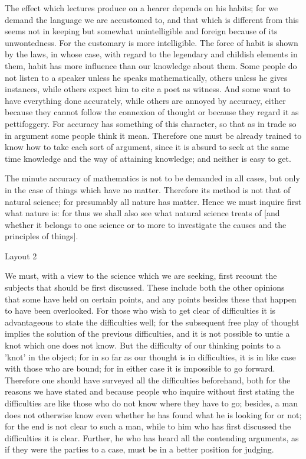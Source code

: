 The effect which lectures produce on a hearer depends on his habits; for we demand the language we are accustomed to, and that which is different from this seems not in keeping but somewhat unintelligible and foreign because of its unwontedness. For the customary is more intelligible. The force of habit is shown by the laws, in whose case, with regard to the legendary and childish elements in them, habit has more influence than our knowledge about them. Some people do not listen to a speaker unless he speaks mathematically, others unless he gives instances, while others expect him to cite a poet as witness. And some want to have everything done accurately, while others are annoyed by accuracy, either because they cannot follow the connexion of thought or because they regard it as pettifoggery. For accuracy has something of this character, so that as in trade so in argument some people think it mean. Therefore one must be already trained to know how to take each sort of argument, since it is absurd to seek at the same time knowledge and the way of attaining knowledge; and neither is easy to get.

The minute accuracy of mathematics is not to be demanded in all cases, but only in the case of things which have no matter. Therefore its method is not that of natural science; for presumably all nature has matter. Hence we must inquire first what nature is: for thus we shall also see what natural science treats of [and whether it belongs to one science or to more to investigate the causes and the principles of things].


Layout 2


We must, with a view to the science which we are seeking, first recount the subjects that should be first discussed. These include both the other opinions that some have held on certain points, and any points besides these that happen to have been overlooked. For those who wish to get clear of difficulties it is advantageous to state the difficulties well; for the subsequent free play of thought implies the solution of the previous difficulties, and it is not possible to untie a knot which one does not know. But the difficulty of our thinking points to a 'knot' in the object; for in so far as our thought is in difficulties, it is in like case with those who are bound; for in either case it is impossible to go forward. Therefore one should have surveyed all the difficulties beforehand, both for the reasons we have stated and because people who inquire without first stating the difficulties are like those who do not know where they have to go; besides, a man does not otherwise know even whether he has found what he is looking for or not; for the end is not clear to such a man, while to him who has first discussed the difficulties it is clear. Further, he who has heard all the contending arguments, as if they were the parties to a case, must be in a better position for judging.

